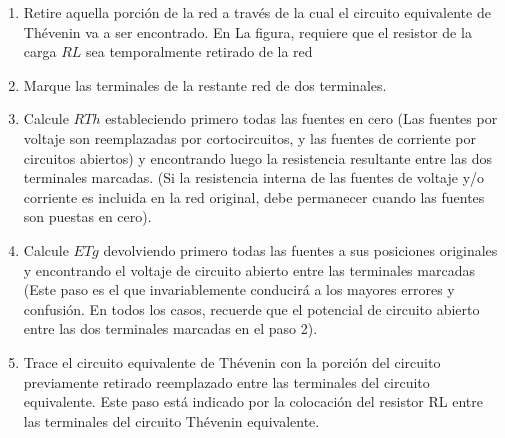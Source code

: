 \begin{enumerate}
	\item Retire aquella porción de la red a través de la cual el circuito equivalente de Thévenin va a ser encontrado. En La figura, requiere que el resistor de la carga $RL$ sea temporalmente retirado de la red
	\item Marque las terminales de la restante red de dos terminales.
	\item Calcule $RTh$ estableciendo primero todas las fuentes en cero (Las fuentes por voltaje son reemplazadas por cortocircuitos, y las fuentes de corriente por circuitos abiertos) y encontrando luego la resistencia resultante entre las dos terminales marcadas. (Si la resistencia interna de las fuentes de voltaje y/o corriente es incluida en la red original, debe permanecer cuando las fuentes son puestas en cero).
	\item Calcule $ETg$ devolviendo primero todas las fuentes a sus posiciones originales y encontrando el voltaje de circuito abierto entre las terminales marcadas (Este paso es el que invariablemente conducirá a los mayores errores y confusión. En todos los casos, recuerde que el potencial de circuito abierto entre las dos terminales marcadas en el paso 2).
	\item Trace el circuito equivalente de Thévenin con la porción del circuito previamente retirado reemplazado entre las terminales del circuito equivalente. Este paso está indicado por la colocación del resistor RL entre las terminales del circuito Thévenin equivalente.
\end{enumerate}

